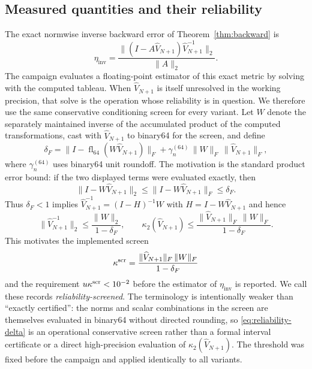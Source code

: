 \documentclass[review,onefignum,onetabnum]{siamart251216}
\newcommand{\fl}{\operatorname{fl}}
\begin{document}
\subsection{Measured quantities and their reliability}
\label{sec:reliability}

The exact normwise inverse backward error of Theorem~\ref{thm:backward} is
%
\begin{equation}\label{eq:etainv}
\eta_{\mathrm{inv}}
=
\frac{\|(I-A\widehat V_{N+1})\widehat V_{N+1}^{-1}\|_2}{\|A\|_2}.
\end{equation}
%
The campaign evaluates a floating-point estimator of this exact metric by solving with the
computed tableau. When $\widehat V_{N+1}$ is itself unresolved in the working precision, that
solve is the operation whose reliability is in question. We therefore use the same conservative conditioning screen for every
variant. Let $W$ denote the separately maintained inverse of the accumulated product of the
computed transformations, cast with $\widehat V_{N+1}$ to binary64 for the screen, and define
%
\begin{equation}\label{eq:reliability-delta}
\delta_F
=
\bigl\|I-\fl_{64}(W\widehat V_{N+1})\bigr\|_F
+
\gamma_n^{(64)}\,\|W\|_F\,\|\widehat V_{N+1}\|_F,
\end{equation}
%
where $\gamma_n^{(64)}$ uses binary64 unit roundoff. The motivation is the standard product
error bound: if the two displayed terms were evaluated exactly, then
%
\[
\|I-W\widehat V_{N+1}\|_2
\le
\|I-W\widehat V_{N+1}\|_F
\le\delta_F.
\]
%
Thus $\delta_F<1$ implies
$\widehat V_{N+1}^{-1}=(I-H)^{-1}W$ with
$H=I-W\widehat V_{N+1}$ and hence
%
\[
\|\widehat V_{N+1}^{-1}\|_2
\le\frac{\|W\|_2}{1-\delta_F},
\qquad
\kappa_2(\widehat V_{N+1})
\le
\frac{\|\widehat V_{N+1}\|_F\,\|W\|_F}{1-\delta_F}.
\]
%
This motivates the implemented screen
%
\begin{equation}\label{eq:reliability}
\kappa^{\rm scr}
=
\frac{\|\widehat V_{N+1}\|_F\,\|W\|_F}{1-\delta_F}
\end{equation}
%
and the requirement $u\kappa^{\rm scr}<10^{-2}$ before the estimator of
$\eta_{\mathrm{inv}}$ is reported. We call these records \emph{reliability-screened}. The
terminology is intentionally weaker than ``exactly certified'': the norms and scalar combinations
in the screen are themselves evaluated in binary64 without directed rounding, so
\eqref{eq:reliability-delta} is an operational conservative screen rather than a formal interval
certificate or a direct high-precision evaluation of $\kappa_2(\widehat V_{N+1})$. The threshold
was fixed before the campaign and applied identically to all variants.
\end{document}
